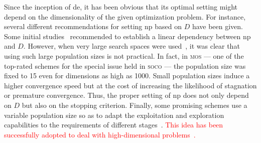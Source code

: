 \documentclass[preprint,3p]{elsarticle}
\newcommand{\DE}{{\sc de}}
\newcommand{\NP}{{\sc np}}
\begin{document}
Since the inception of \DE{}, it has been obvious that its optimal setting might depend on the dimensionality of the given optimization problem.
%
For instance, several different recommendations for setting \NP{} based on $D$ have been given.
%
Some initial studies~\cite{Gamperle:02,Zielinski:06} recommended to establish a linear dependency between \NP{} and $D$.
%
However, when very large search spaces were used~\cite{Olguin:13}, it was clear that using such large population sizes is not
practical.
%
%
In fact, in \textsc{mos} --- one of the top-rated schemes
for the special issue held in \textsc{soco} --- the population size was fixed to 15 even
for dimensions as high as 1000.
%
Small population sizes induce a higher convergence speed but at the cost of increasing the likelihood of
stagnation or premature convergence.
%
Thus, the proper setting of \NP{} does not only depend on $D$ but also on the stopping criterion.
%
%
%
Finally, some promising schemes use a variable population size so as to adapt the exploitation and exploration capabilities
to the requirements of different stages~\cite{Brest:08,Zhu:13}.
%
\textcolor{red}{
This idea has been successfully adopted to deal with high-dimensional problems~\cite{Brest:11}.}
%
\end{document}
